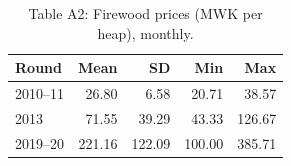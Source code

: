 \begin{table}[ht]
\centering
\caption{Table A2: Firewood prices (MWK per heap), monthly.} 
\label{tab:A2_firewood}
\begin{tabular}{lrrrr}
  \hline
Round & Mean & SD & Min & Max \\ 
  \hline
2010--11 & 26.80 & 6.58 & 20.71 & 38.57 \\ 
  2013 & 71.55 & 39.29 & 43.33 & 126.67 \\ 
  2019--20 & 221.16 & 122.09 & 100.00 & 385.71 \\ 
   \hline
\end{tabular}
\end{table}

